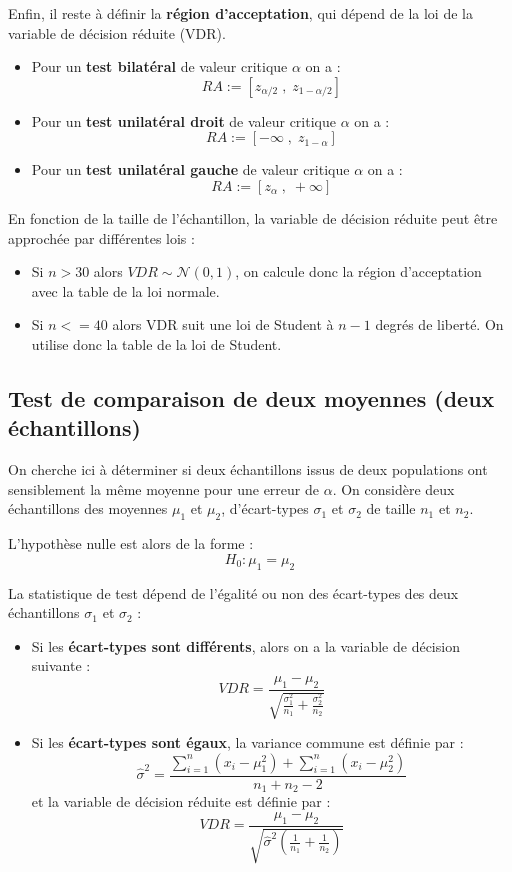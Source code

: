 Enfin, il reste à définir la \textbf{région d'acceptation}, qui dépend de la loi de la variable de décision réduite (VDR). 
\begin{itemize}
    \item Pour un \textbf{test bilatéral} de valeur critique $\alpha$ on a :
        \[ RA := [z_{\alpha/2} \; , \; z_{1 - \alpha/2}] \] 
    \item Pour un \textbf{test unilatéral droit} de valeur critique $\alpha$ on a :
        \[ RA := [- \infty \; , \; z_{1-\alpha}] \] 
    \item Pour un \textbf{test unilatéral gauche} de valeur critique $\alpha$ on a :
        \[ RA := [z_\alpha \; , \; + \infty ] \] 
\end{itemize}

\begin{remark}
    En fonction de la taille de l'échantillon, la variable de décision réduite peut être approchée par différentes lois :
    \begin{itemize}
        \item Si $n > 30$ alors $VDR \sim \mathcal{N}(0,1)$, on calcule donc la région d'acceptation avec la table de la loi normale. 
        \item Si $n <= 40$ alors VDR suit une loi de Student à $n-1$ degrés de liberté. On utilise donc la table de la loi de Student. 
    \end{itemize}
\end{remark}


\subsection{Test de comparaison de deux moyennes (deux échantillons)}

On cherche ici à déterminer si deux échantillons issus de deux populations ont sensiblement la même moyenne 
pour une erreur de $\alpha$. 
On considère deux échantillons des moyennes $\mu_1$ et $\mu_2$, d'écart-types $\sigma_1$ et $\sigma_2$ de taille $n_1$ et $n_2$. 

L'hypothèse nulle est alors de la forme : 
    \[ H_0 : \mu_1 = \mu_2 \] 

La statistique de test dépend de l'égalité ou non des écart-types des deux échantillons $\sigma_1$ et $\sigma_2$ :
\begin{itemize}
    \item Si les \textbf{écart-types sont différents}, alors on a la variable de décision suivante :
        \[ VDR = \frac{\mu_1 - \mu_2}{\sqrt{\frac{\sigma_1^2}{n_1} + \frac{\sigma_2^2}{n_2}}} \] 
    \item Si les \textbf{écart-types sont égaux}, la variance commune est définie par :
        \[ \hat{\sigma}^2 = \frac{\sum_{i=1}^{n} (x_i - \mu_1^2) + \sum_{i=1}^{n} (x_i - \mu_2^2)}{n_1 + n_2 - 2} \] 
    et la variable de décision réduite est définie par :
        \[ VDR = \frac{{\mu_1 - \mu_2}}{\sqrt{\hat{\sigma}^2 \left( \frac{1}{n_1} + \frac{1}{n_2}\right)}} \] 
\end{itemize}

